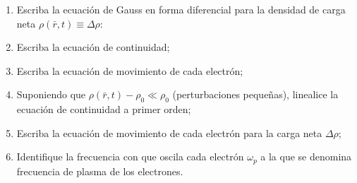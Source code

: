 \documentclass[]{article}
\begin{document}
\begin{enumerate}
  \begin{enumerate}
  \item Escriba la ecuación de Gauss en forma diferencial para la densidad de carga neta $\rho(\bar{r},t)\equiv\Delta\rho$:
  \item Escriba la ecuación de continuidad;
  \item Escriba la ecuación de movimiento de cada electrón;
  \item Suponiendo que $\rho(\bar{r},t)-\rho_0\ll \rho_0$ (perturbaciones pequeñas), linealice la ecuación de continuidad a primer orden;
  \item Escriba la ecuación de movimiento de cada electrón para la carga neta $\Delta\rho$;
  \item Identifique la frecuencia con que oscila cada electrón $\omega_p$ a la que se denomina frecuencia de plasma de los electrones. 
  \end{enumerate}


\end{enumerate}
\end{document}
